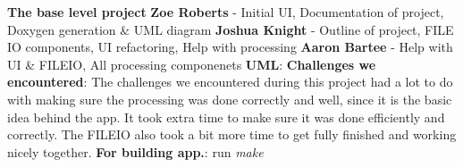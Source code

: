 \label{index_md_README}%
%
{\bfseries{The base level project}} {\bfseries{Zoe Roberts}} -\/ Initial UI, Documentation of project, Doxygen generation \& UML diagram {\bfseries{Joshua Knight}} -\/ Outline of project, FILE IO components, UI refactoring, Help with processing {\bfseries{Aaron Bartee}} -\/ Help with UI \& FILEIO, All processing componenets {\bfseries{UML}}\+: {\bfseries{Challenges we encountered}}\+: The challenges we encountered during this project had a lot to do with making sure the processing was done correctly and well, since it is the basic idea behind the app. It took extra time to make sure it was done efficiently and correctly. The FILEIO also took a bit more time to get fully finished and working nicely together. {\bfseries{For building app.}}\+: run {\itshape make} 